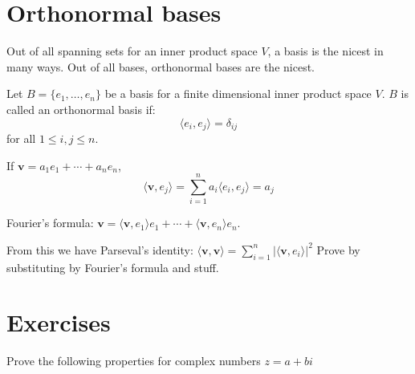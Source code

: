 \documentclass{scrartcl}
\newcommand{\bv}{\mathbf{v}}
\newcommand{\angb}[1]{\langle #1 \rangle}
\begin{document}
\section{Orthonormal bases}
Out of all spanning sets for an inner product space $V$, a basis is the nicest in
many ways. Out of all bases, orthonormal bases are the nicest.
\begin{definition}
    Let $B = \{e_1, \dots, e_n\}$ be a basis for a finite dimensional inner product space
    $V$. $B$ is called an orthonormal basis if:
    \[\angb{e_i, e_j} = \delta_{ij}\] for all $1 \leq i, j \leq n$.

\end{definition}

If $\bv = a_1e_1 + \cdots + a_ne_n$,
\[\angb{\bv, e_j} = \sum_{i=1}^{n}{a_i\angb{e_i, e_j}} = a_j\]

Fourier's formula:
$\bv = \angb{\bv, e_1}e_1 + \cdots + \angb{\bv, e_n}e_n$.

From this we have Parseval's identity:
$\angb{\bv, \bv} = \sum_{i=1}^{n}{|\angb{\bv, e_i}|^2}$
Prove by substituting by Fourier's formula and stuff.





\section{Exercises}
\begin{problem}
Prove the following properties for complex numbers $z = a+bi$
\end{problem}
\end{document}
